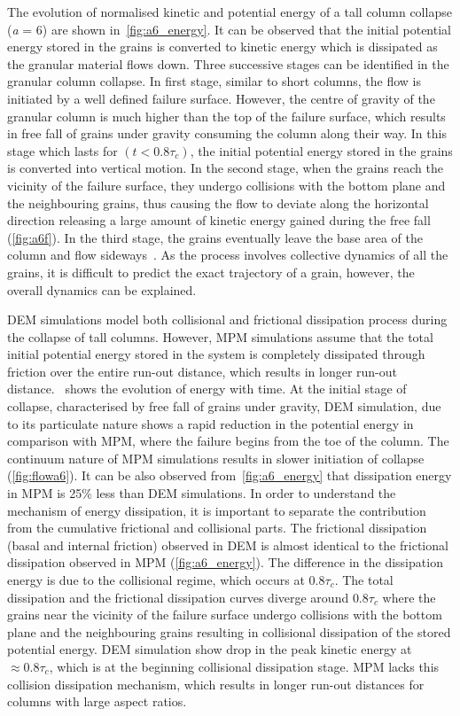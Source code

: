 The evolution of normalised kinetic and potential energy of a tall column 
collapse (\textit{a} = 6) are shown in~\cref{fig:a6_energy}. It can be 
observed that the initial potential energy stored in the 
grains is converted to kinetic energy which is dissipated as the granular 
material flows down. Three successive stages can be identified in the granular 
column collapse. In first stage, similar to short columns, the flow is 
initiated by a well defined failure surface. However, the centre of gravity of 
the granular column is much 
higher than the top of the failure surface, which results in free fall of 
grains under gravity 
consuming the column along their way. In this stage which lasts for
$(t<0.8\tau_{c})$, the initial potential energy stored in the grains is 
converted into vertical motion. In the second stage, when the grains reach the 
vicinity of the failure surface, they undergo collisions with the bottom plane 
and the neighbouring grains, thus causing the flow to deviate along the 
horizontal direction releasing a large amount of kinetic energy gained during 
the free fall (\cref{fig:a6f}). In the third stage, the grains eventually 
leave the base area of the column and flow sideways~\citep{Lajeunesse2004}. As 
the process involves collective dynamics of all the grains, it is difficult 
to predict the exact trajectory of a grain, however, the overall dynamics can 
be explained. 


DEM simulations model both collisional and frictional dissipation process 
during the collapse of tall columns. However, MPM simulations assume that the 
total initial potential energy stored in the system is completely dissipated 
through friction over the entire run-out distance, which results in longer 
run-out distance.~ shows the evolution of energy with time. 
At the initial stage of collapse, characterised by free fall of grains under 
gravity, DEM simulation, due to its particulate nature shows a rapid reduction 
in the potential energy in comparison with MPM, where the failure begins from 
the toe of the column. The continuum nature of MPM simulations results in 
slower initiation of collapse (\cref{fig:flowa6}). It can be also observed 
from~\cref{fig:a6_energy} that dissipation energy in MPM is 25\% less than DEM 
simulations. In order to understand the mechanism of energy dissipation, it is 
important to separate the contribution from the cumulative frictional and 
collisional parts. The frictional dissipation (basal and internal friction) 
observed in DEM is almost identical to the frictional dissipation observed in 
MPM (\cref{fig:a6_energy}). The difference in the dissipation energy is due to 
the collisional regime, which occurs at $0.8\tau_c$. The total dissipation and 
the frictional dissipation curves diverge around $0.8\tau_c$ where the grains 
near the vicinity of the failure surface undergo collisions with the bottom 
plane and the neighbouring grains resulting in collisional dissipation of the 
stored potential energy. DEM simulation show drop in the peak kinetic energy at 
$\approx0.8\tau_c$, which is at the beginning collisional dissipation stage. 
MPM lacks this collision dissipation mechanism, which results in longer run-out 
distances for columns with large aspect ratios. 

